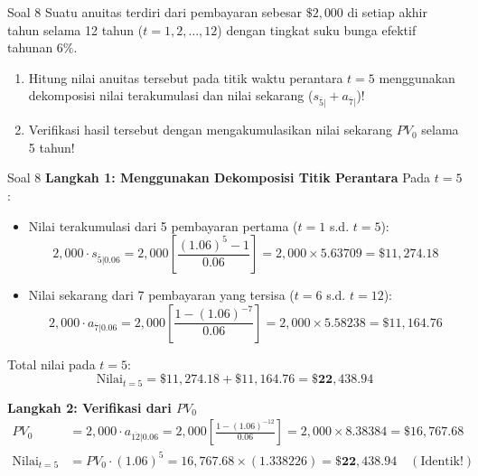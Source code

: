 \documentclass[11pt,a4paper]{article}
\begin{document}
\vspace{1.5em}

\begin{problembox}{Soal 8}
Suatu anuitas terdiri dari pembayaran sebesar $\$2{,}000$ di setiap akhir tahun selama 12 tahun ($t = 1, 2, \dots, 12$) dengan tingkat suku bunga efektif tahunan $6\%$.
\begin{enumerate}[label=(\alph*)]
    \item Hitung nilai anuitas tersebut pada titik waktu perantara $t = 5$ menggunakan dekomposisi nilai terakumulasi dan nilai sekarang ($s_{\overline{5}|} + a_{\overline{7}|}$)!
    \item Verifikasi hasil tersebut dengan mengakumulasikan nilai sekarang $PV_0$ selama 5 tahun!
\end{enumerate}
\end{problembox}

\begin{solutionbox}{Soal 8}
\textbf{Langkah 1: Menggunakan Dekomposisi Titik Perantara}
Pada $t = 5$:
\begin{itemize}
    \item Nilai terakumulasi dari 5 pembayaran pertama ($t=1$ s.d. $t=5$):
    \begin{equation*}
        2{,}000 \cdot s_{\overline{5}|0.06} = 2{,}000 \left[\frac{(1.06)^5 - 1}{0.06}\right] = 2{,}000 \times 5.63709 = \$11{,}274.18
    \end{equation*}
    \item Nilai sekarang dari 7 pembayaran yang tersisa ($t=6$ s.d. $t=12$):
    \begin{equation*}
        2{,}000 \cdot a_{\overline{7}|0.06} = 2{,}000 \left[\frac{1 - (1.06)^{-7}}{0.06}\right] = 2{,}000 \times 5.58238 = \$11{,}164.76
    \end{equation*}
\end{itemize}
Total nilai pada $t = 5$:
\begin{equation*}
    \text{Nilai}_{t=5} = \$11{,}274.18 + \$11{,}164.76 = \mathbf{\$22{,}438.94}
\end{equation*}

\textbf{Langkah 2: Verifikasi dari $PV_0$}
\begin{align*}
    PV_0 &= 2{,}000 \cdot a_{\overline{12}|0.06} = 2{,}000 \left[\frac{1 - (1.06)^{-12}}{0.06}\right] = 2{,}000 \times 8.38384 = \$16{,}767.68 \\[0.4em]
    \text{Nilai}_{t=5} &= PV_0 \cdot (1.06)^5 = 16{,}767.68 \times (1.338226) = \mathbf{\$22{,}438.94} \quad (\text{Identik!})
\end{align*}
\end{solutionbox}
\end{document}
